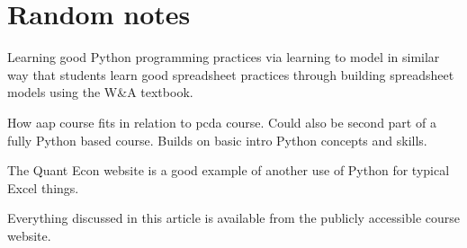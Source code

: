 \documentclass[ited,blindrev]{informs3}              %
\begin{document}
\section{Random notes}
Learning good Python programming practices via learning to model in similar way that students learn good spreadsheet practices through building spreadsheet models using the W\&A textbook.

How aap course fits in relation to pcda course. Could also be second part of a fully Python based course. Builds on basic intro Python concepts and skills.

The Quant Econ website is a good example of another use of Python for typical Excel things.

Everything discussed in this article is available from the publicly accessible course website.

\ACKNOWLEDGMENT{%
}%


%
%
%




\end{document}
